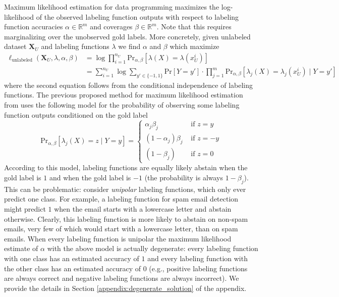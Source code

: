Maximum likelihood estimation for data programming maximizes the log-likelihood of the observed labeling function outputs with respect to labeling function accuracies $\alpha\in\mathbb{R}^m$ and coverages $\beta\in\mathbb{R}^m$. Note that this requires marginalizing over the unobserved gold labels. More concretely, given unlabeled dataset $\boldsymbol{X}_U$ and labeling functions $\lambda$ we find $\alpha$ and $\beta$ which maximize 
\begin{align}
    \ell_\text{unlabeled}(\boldsymbol{X}_U,\lambda,\alpha,\beta)&=\log\prod_{i=1}^{n_U}\text{Pr}_{\alpha,\beta}[\lambda(X)=\lambda(x^i_U)]\\
    &=\sum_{i=1}^{n_U}\log\sum_{y'\in\{-1,1\}}\text{Pr}[Y=y']\cdot\prod_{j=1}^m\text{Pr}_{\alpha,\beta}[\lambda_j(X)=\lambda_j(x^i_U)\mid Y=y']
\end{align}
where the second equation follows from the conditional independence of labeling functions. The previous proposed method for maximum likelihood estimation from \cite{alex2016data} uses the following model for the probability of observing some labeling function outputs conditioned on the gold label
\begin{equation}
    \text{Pr}_{\alpha,\beta}[\lambda_j(X)=z\mid Y=y]=\begin{cases}
        \alpha_j\beta_j&\text{ if }z=y\\
        (1-\alpha_j)\beta_j&\text{ if }z=-y\\
        (1-\beta_j)&\text{ if }z=0
    \end{cases}
\end{equation}
According to this model, labeling functions are equally likely abstain when the gold label is $1$ and when the gold label is $-1$ (the probability is always $1-\beta_j$). This can be problematic: consider \textit{unipolar} labeling functions, which only ever predict one class. For example, a labeling function for spam email detection might predict $1$ when the email starts with a lowercase letter and abstain otherwise. Clearly, this labeling function is more likely to abstain on non-spam emails, very few of which would start with a lowercase letter, than on spam emails. When every labeling function is unipolar the maximum likelihood estimate of $\alpha$ with the above model is actually degenerate: every labeling function with one class has an estimated accuracy of $1$ and every labeling function with the other class has an estimated accuracy of $0$ (e.g., positive labeling functions are always correct and negative labeling functions are always incorrect). We provide the details in Section \ref{appendix:degenerate_solution} of the appendix. 


